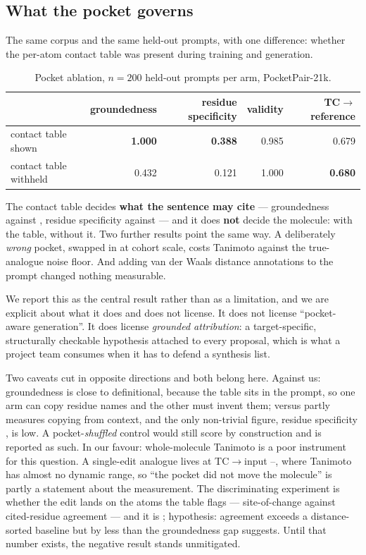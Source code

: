 \subsection{What the pocket governs}
\label{sec:pocket}

The same corpus and the same held-out prompts, with one difference: whether the per-atom contact
table was present during training and generation.

\begin{table}[H]\centering\small
\begin{tabular}{lrrrr}
\toprule
 & groundedness & residue specificity & validity & TC$\rightarrow$reference \\
\midrule
contact table shown & \textbf{1.000} & \textbf{0.388} & 0.985 & 0.679 \\
contact table withheld & 0.432 & 0.121 & 1.000 & \textbf{0.680} \\
\bottomrule
\end{tabular}
\caption{Pocket ablation, $n=200$ held-out prompts per arm, PocketPair-21k.}
\label{tab:pocket}
\end{table}

The contact table decides \textbf{what the sentence may cite} --- groundedness  against
, residue specificity  against  --- and it does \textbf{not} decide the
molecule:  with the table,  without it. Two further results point the same way. A
deliberately \emph{wrong} pocket, swapped in at cohort scale, costs  Tanimoto against the
true-analogue noise floor. And adding van der Waals distance annotations to the prompt changed
nothing measurable.

We report this as the central result rather than as a limitation, and we are explicit about what it
does and does not license. It does not license ``pocket-aware generation''. It does license
\emph{grounded attribution}: a target-specific, structurally checkable hypothesis attached to every
proposal, which is what a project team consumes when it has to defend a synthesis list.

Two caveats cut in opposite directions and both belong here. Against us: groundedness is close to
definitional, because the table sits in the prompt, so one arm can copy residue names and the other
must invent them;  versus  partly measures copying from context, and the only
non-trivial figure, residue specificity , is low. A pocket-\emph{shuffled} control would
still score  by construction and is reported as such. In our favour: whole-molecule
Tanimoto is a poor instrument for this question. A single-edit analogue lives at
TC$\rightarrow$input --, where Tanimoto has almost no dynamic range, so
``the pocket did not move the molecule'' is partly a statement about the measurement. The
discriminating experiment is whether the edit lands on the atoms the table flags --- site-of-change
against cited-residue agreement --- and it is ;
hypothesis: agreement exceeds a distance-sorted baseline but by less than the groundedness gap
suggests. Until that number exists, the negative result stands unmitigated.

